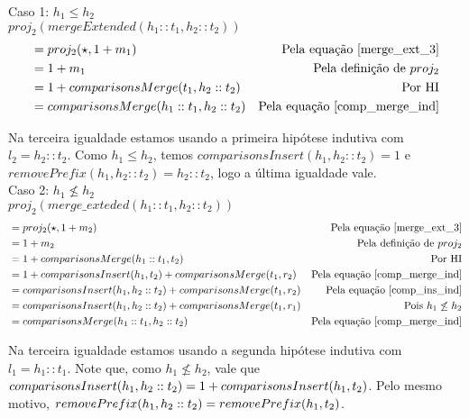 \documentclass[12pt, oneside, a4paper,english,brazil]{abntex2}
\begin{document}
Caso 1: $h_{1} \le h_{2}$\\

$proj_{2}(mergeExtended(h_{1} :: t_{1}, h_{2} :: t_{2}))$
\begin{align*}
   &= proj_{2}(\star, 1 + m_{1}) &\text{Pela equa\c{c}\~ao \ref{merge_ext_3}}\\
  &= 1 + m_{1} &\text{Pela defini\c{c}\~ao de $proj_{2}$} \\
   &= 1 + comparisonsMerge(t_{1}, h_{2} :: t_{2}) &\text{Por HI} \\
  &= comparisonsMerge(h_{1} :: t_{1}, h_{2} :: t_{2}) &\text{Pela equa\c{c}\~ao \ref{comp_merge_ind}}
\end{align*}

Na terceira igualdade estamos usando a primeira hip\'otese indutiva com $l_{2} =
h_{2} :: t_{2}$. Como $h_{1} \le h_{2}$, temos $comparisonsInsert(h_{1}, h_{2}
:: t_{2}) = 1$ e $removePrefix(h_{1}, h_{2} :: t_{2}) = h_{2} :: t_{2}$, logo a \'ultima
igualdade vale. \\


Caso 2: $h_{1} \not \le h_{2}$\\

$proj_{2}(merge\_exteded(h_{1} :: t_{1}, h_{2} :: t_{2}))$
\begin{align*}
  &= proj_{2}(\star, 1 + m_{2}) &\text{Pela equa\c{c}\~ao \ref{merge_ext_3}}\\
  &= 1 + m_{2} &\text{Pela defini\c{c}\~ao de $proj_{2}$}\\
  &= 1 + comparisonsMerge(h_{1} :: t_{1}, t_{2}) &\text{Por HI} \\
  &= 1 + comparisonsInsert(h_{1}, t_{2}) + comparisonsMerge(t_{1}, r_{2}) &\text{Pela equa\c{c}\~ao \ref{comp_merge_ind}}\\
  &= comparisonsInsert(h_{1}, h_{2} :: t_{2}) + comparisonsMerge(t_{1}, r_{2}) &\text{Pela equa\c{c}\~ao \ref{comp_ins_ind}}\\
  &= comparisonsInsert(h_{1}, h_{2} :: t_{2}) + comparisonsMerge(t_{1}, r_{1}) &\text{Pois $h_{1} \not \le h_{2}$}\\
  &= comparisonsMerge(h_{1} :: t_{1}, h_{2} :: t_{2}) &\text{Pela equa\c{c}\~ao \ref{comp_merge_ind}}
\end{align*}

Na terceira igualdade estamos usando a segunda hip\'otese indutiva com $l_{1} =
h_{1} :: t_{1}$. Note que,
como $h_{1} \not \le h_{2}$, vale que $comparisonsInsert(h_{1}, h_{2} ::
t_{2}) = 1 + \\comparisonsInsert(h_{1}, t_{2})$. Pelo mesmo motivo,
$removePrefix(h_{1}, h_{2} :: t_{2}) =\\removePrefix(h_{1}, t_{2})$.
\end{document}
